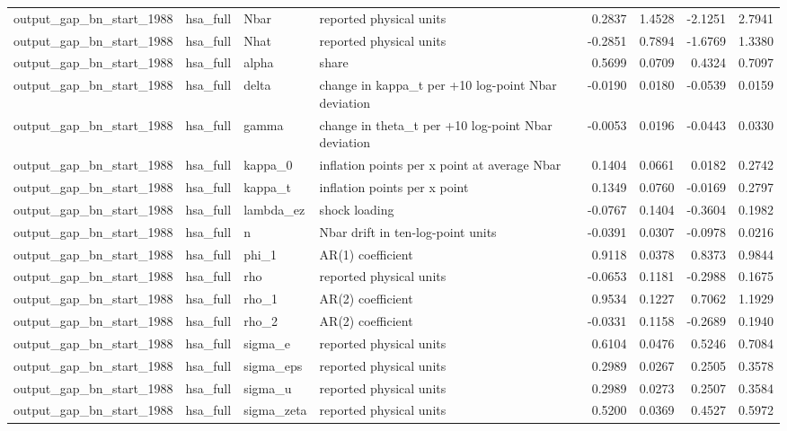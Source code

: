 \begin{tabular}{llllrrrr}
output\_gap\_bn\_start\_1988 & hsa\_full & Nbar & reported physical units & 0.2837 & 1.4528 & -2.1251 & 2.7941 \\
output\_gap\_bn\_start\_1988 & hsa\_full & Nhat & reported physical units & -0.2851 & 0.7894 & -1.6769 & 1.3380 \\
output\_gap\_bn\_start\_1988 & hsa\_full & alpha & share & 0.5699 & 0.0709 & 0.4324 & 0.7097 \\
output\_gap\_bn\_start\_1988 & hsa\_full & delta & change in kappa\_t per +10 log-point Nbar deviation & -0.0190 & 0.0180 & -0.0539 & 0.0159 \\
output\_gap\_bn\_start\_1988 & hsa\_full & gamma & change in theta\_t per +10 log-point Nbar deviation & -0.0053 & 0.0196 & -0.0443 & 0.0330 \\
output\_gap\_bn\_start\_1988 & hsa\_full & kappa\_0 & inflation points per x point at average Nbar & 0.1404 & 0.0661 & 0.0182 & 0.2742 \\
output\_gap\_bn\_start\_1988 & hsa\_full & kappa\_t & inflation points per x point & 0.1349 & 0.0760 & -0.0169 & 0.2797 \\
output\_gap\_bn\_start\_1988 & hsa\_full & lambda\_ez & shock loading & -0.0767 & 0.1404 & -0.3604 & 0.1982 \\
output\_gap\_bn\_start\_1988 & hsa\_full & n & Nbar drift in ten-log-point units & -0.0391 & 0.0307 & -0.0978 & 0.0216 \\
output\_gap\_bn\_start\_1988 & hsa\_full & phi\_1 & AR(1) coefficient & 0.9118 & 0.0378 & 0.8373 & 0.9844 \\
output\_gap\_bn\_start\_1988 & hsa\_full & rho & reported physical units & -0.0653 & 0.1181 & -0.2988 & 0.1675 \\
output\_gap\_bn\_start\_1988 & hsa\_full & rho\_1 & AR(2) coefficient & 0.9534 & 0.1227 & 0.7062 & 1.1929 \\
output\_gap\_bn\_start\_1988 & hsa\_full & rho\_2 & AR(2) coefficient & -0.0331 & 0.1158 & -0.2689 & 0.1940 \\
output\_gap\_bn\_start\_1988 & hsa\_full & sigma\_e & reported physical units & 0.6104 & 0.0476 & 0.5246 & 0.7084 \\
output\_gap\_bn\_start\_1988 & hsa\_full & sigma\_eps & reported physical units & 0.2989 & 0.0267 & 0.2505 & 0.3578 \\
output\_gap\_bn\_start\_1988 & hsa\_full & sigma\_u & reported physical units & 0.2989 & 0.0273 & 0.2507 & 0.3584 \\
output\_gap\_bn\_start\_1988 & hsa\_full & sigma\_zeta & reported physical units & 0.5200 & 0.0369 & 0.4527 & 0.5972 \\

\end{tabular}
